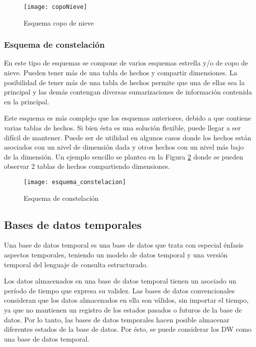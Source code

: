 \documentclass[a4paper,11pt]{article}
\begin{document}
\begin{flushleft}
    \begin{figure}
      \begin{center}
        \texttt{[image: copoNieve]}
        \caption{Esquema copo de nieve} \cite{dim_models}
        \label{snow_flk_sch}
      \end{center}
    \end{figure}
    
    
    \subsubsection{Esquema de constelación}
    
    En este tipo de esquemas se compone de varios esquemas estrella y/o de copo de nieve. Pueden tener más de una tabla de hechos y compartir dimensiones.
    La posibilidad de tener más de una tabla de hechos permite que una de ellas sea la principal y las demás contengan diversas sumarizaciones de información
    contenida en la principal.\par
    
    Este esquema es más complejo que los esquemas anteriores, debido a que contiene varias tablas de hechos. Si bien ésta es una solución flexible, puede 
    llegar a ser difícil de mantener. Puede ser de utilidad en algunos casos donde los hechos están asociados con un nivel de dimensión dada y otros hechos 
    con un nivel más bajo de la dimensión. Un ejemplo sencillo se plantea en la Figura \ref{const_sch} donde se pueden observar 2 tablas de hechos 
    compartiendo dimensiones.
    
    \begin{figure}
      \begin{center}
        \texttt{[image: esquema\_constelacion]}
        \caption{Esquema de constelación} \cite{dim_models}
        \label{const_sch}
      \end{center}
    \end{figure}
    
    
    \subsection{Bases de datos temporales}
    
    Una base de datos temporal es una base de datos que trata con especial énfasis aspectos temporales, teniendo un modelo de datos temporal y una versión
    temporal del lenguaje de consulta estructurado.\par
    Los datos almacenados en una base de datos temporal tienen un asociado un período de tiempo que expresa su validez. Las bases de datos convencionales
    consideran que los datos almacenados en ella son válidos, sin importar el tiempo, ya que no mantienen un registro de los estados pasados o futuros de
    la base de datos. Por lo tanto, las bases de datos temporales hacen posible almacenar diferentes estados de la base de datos. Por ésto, se puede 
    considerar los DW como una base de datos temporal.
    

\end{flushleft}
\end{document}
